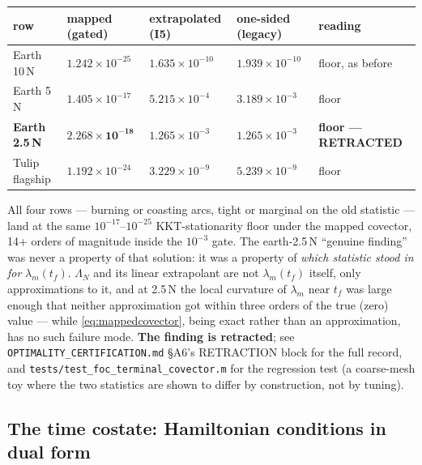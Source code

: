 \documentclass[11pt]{article}
\newcommand{\file}[1]{\texttt{#1}}
\begin{document}
\begin{center}
\small
\begin{tabular}{@{}lllll@{}}
\toprule
row & mapped (gated) & extrapolated (I5) & one-sided (legacy) & reading \\
\midrule
Earth 10\,N & $1.242\times10^{-25}$ & $1.635\times10^{-10}$ & $1.939\times10^{-10}$ & floor, as before \\
Earth 5\,N  & $1.405\times10^{-17}$ & $5.215\times10^{-4}$ & $3.189\times10^{-3}$ & floor \\
\textbf{Earth 2.5\,N} & $\mathbf{2.268\times10^{-18}}$ & $1.265\times10^{-3}$ & $1.265\times10^{-3}$ & \textbf{floor --- RETRACTED} \\
Tulip flagship & $1.192\times10^{-24}$ & $3.229\times10^{-9}$ & $5.239\times10^{-9}$ & floor \\
\bottomrule
\end{tabular}
\end{center}
\noindent
All four rows --- burning or coasting arcs, tight or marginal on the old
statistic --- land at the same $10^{-17}$--$10^{-25}$ KKT-stationarity floor
under the mapped covector, 14+ orders of magnitude inside the $10^{-3}$ gate.
The earth-2.5\,N ``genuine finding'' was never a property of that solution:
it was a property of \emph{which statistic stood in for} $\lambda_m(t_f)$.
$\Lambda_N$ and its linear extrapolant are not $\lambda_m(t_f)$ itself, only
approximations to it, and at 2.5\,N the local curvature of $\lambda_m$ near
$t_f$ was large enough that neither approximation got within three orders of
the true (zero) value --- while \eqref{eq:mappedcovector}, being exact rather
than an approximation, has no such failure mode. \textbf{The finding is
retracted}; see \file{OPTIMALITY\_CERTIFICATION.md} \S A6's RETRACTION block
for the full record, and \file{tests/test\_foc\_terminal\_covector.m} for the
regression test (a coarse-mesh toy where the two statistics are shown to
differ by construction, not by tuning).

\subsection{The time costate: Hamiltonian conditions in dual form}
\label{sec:timecostate}
\end{document}
